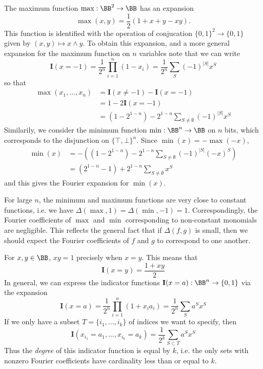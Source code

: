 \begin{example}
    The maximum function $\max: \BB^2 \to \BB$ has an expansion
    \[ \max(x,y) = \frac{1}{2} \left( 1 + x + y - xy \right). \]
    This function is identified with the operation of conjucation $\{ 0, 1 \}^2 \to \{ 0, 1 \}$ given by $(x,y) \mapsto x \wedge y$. To obtain this expansion, and a more general expansion for the maximum function on $n$ variables note that we can write
    \[ \mathbf{I}(x = -1) = \frac{1}{2^n} \prod_{i = 1}^n (1 - x_i) = \frac{1}{2^n} \sum_S (-1)^{|S|} x^S \]
    so that
    \begin{align*}
        \max(x_1, \dots, x_n) &= \mathbf{I}(x \neq -1) - \mathbf{I}(x = -1)\\
        &= 1 - 2 \mathbf{I}(x = -1)\\
        &= (1 - 2^{1-n}) - 2^{1-n} \sum_{S \neq \emptyset} (-1)^{|S|} x^S
    \end{align*}
    Similarily, we consider the minimum function $\min: \BB^n \to \BB$ on $n$ bits, which corresponds to the disjunction on $\{ \top, \bot \}^n$. Since $\min(x) = -\max(-x)$,
    \begin{align*}
        \min(x) &= - \left( ( 1 - 2^{1-n} ) - 2^{1-n} \sum_{S \neq \emptyset} (-1)^{|S|} (-x)^S \right)\\
        &= ( 2^{1-n} - 1 ) + 2^{1-n} \sum_{S \neq \emptyset} x^S
    \end{align*}
    and this gives the Fourier expansion for $\min(x)$.
\end{example}

For large $n$, the minimum and maximum functions are very close to constant functions, i.e. we have $\Delta(\max, 1) = \Delta(\min, -1) = 1$. Correspondingly, the Fourier coefficients of $\max$ and $\min$ corresponding to non-constant monomials are negligible. This reflects the general fact that if $\Delta(f,g)$ is small, then we should expect the Fourier coefficients of $f$ and $g$ to correspond to one another.

\begin{example}
    For $x,y \in \BB$, $xy = 1$ precisely when $x = y$. This means that
    \[ \mathbf{I}(x = y) = \frac{1 + xy}{2} \]
    In general, we can express the indicator functions $\mathbf{I}(x = a): \BB^n \to \{ 0, 1 \}$ via the expansion
    \[ \mathbf{I}(x = a) = \frac{1}{2^n} \prod_{i = 1}^n \left( 1 + x_i a_i \right) = \frac{1}{2^n} \sum_S a^S x^S \]
    If we only have a subset $T = \{ i_1, \dots, i_k \}$ of indices we want to specify, then
    \[ \mathbf{I}(x_{i_1} = a_1, \dots, x_{i_k} = a_k) = \frac{1}{2^k} \sum_{S \subset T} a^S x^S \]
    Thus the \emph{degree} of this indicator function is equal by $k$, i.e. the only sets with nonzero Fourier coefficients have cardinality less than or equal to $k$.
\end{example}


